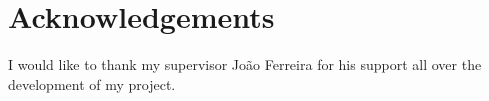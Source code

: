 \chapter*{Acknowledgements}

\hspace{15mm}I would like to thank my supervisor Jo\~{a}o Ferreira for his support all over the development of my project.


\clearpage